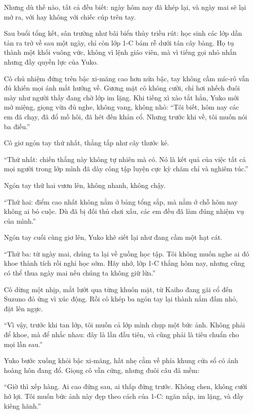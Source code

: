 \documentclass[../main.tex]{subfiles}
\begin{document}
Nhưng dù thế nào, tất cả đều biết: ngày hôm nay đã khép lại, và ngày mai sẽ lại mở ra, với hay không với chiếc cúp trên tay.

\ct

Sau buổi tổng kết, sân trường như bãi biển thủy triều rút: học sinh các lớp dần tản ra trở về sau một ngày, chỉ còn lớp 1-C bám rễ dưới tán cây bàng. Họ tụ thành một khối vuông vức, không vì lệnh giáo viên, mà vì tiếng gọi nhỏ nhắn nhưng đầy quyền lực của Yuko.

Cô chủ nhiệm đứng trên bậc xi-măng cao hơn nửa bậc, tay không cầm míc-rô vẫn đủ khiến mọi ánh mắt hướng về. Gương mặt cô không cười, chỉ hơi nhếch đuôi mày như người thầy đang chờ lớp im lặng. Khi tiếng xì xào tắt hẳn, Yuko mới mở miệng, giọng vừa đủ nghe, không vang, không nhỏ: ``Tôi biết, hôm nay các em đã chạy, đã đổ mồ hôi, đã hét đến khản cổ. Nhưng trước khi về, tôi muốn nói ba điều.''

Cô giơ ngón tay thứ nhất, thẳng tắp như cây thước kẻ.

``Thứ nhất: chiến thắng này không tự nhiên mà có. Nó là kết quả của việc tất cả mọi người trong lớp mình đã dày công tập luyện cực kỳ chăm chỉ và nghiêm túc.''

Ngón tay thứ hai vươn lên, không nhanh, không chậy.

``Thứ hai: điểm cao nhất không nằm ở bảng tổng sắp, mà nằm ở chỗ hôm nay không ai bỏ cuộc. Dù đã bị đối thủ chơi xấu, các em đều đã làm đúng nhiệm vụ của mình.''

Ngón tay cuối cùng giơ lên, Yuko khẽ siết lại như đang cầm một hạt cát.

``Thứ ba: từ ngày mai, chúng ta lại về guồng học tập. Tôi không muốn nghe ai đó khoe thành tích rồi nghỉ học sớm. Hãy nhớ, lớp 1-C thắng hôm nay, nhưng cũng có thể thua ngày mai nếu chúng ta không giữ lửa.''

Cô dừng một nhịp, mắt lướt qua từng khuôn mặt, từ Kaiho đang gãi cổ đến Suzuno đỏ ửng vì xúc động. Rồi cô khép ba ngón tay lại thành nắm đấm nhỏ, đặt lên ngực.

``Vì vậy, trước khi tan lớp, tôi muốn cả lớp mình chụp một bức ảnh. Không phải để khoe, mà để nhắc nhau: đây là lần đầu tiên, và cũng phải là tiêu chuẩn cho mọi lần sau.''

Yuko bước xuống khỏi bậc xi-măng, hất nhẹ cằm về phía khung cửa sổ có ánh hoàng hôn đang đổ. Giọng cô vẫn cứng, nhưng đuôi câu đã mềm:

``Giờ thì xếp hàng. Ai cao đứng sau, ai thấp đứng trước. Không chen, không cười hở lợi. Tôi muốn bức ảnh này đẹp theo cách của 1-C: ngăn nắp, im lặng, và đầy kiêng hãnh.''
\end{document}
